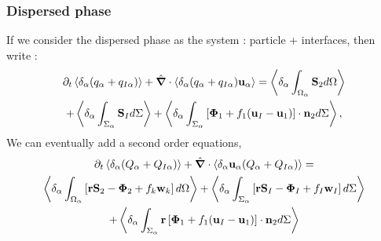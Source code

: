 \subsubsection{Dispersed phase}
If we consider the dispersed phase as the system : particle + interfaces, then write : 
\begin{multline}
    \partial_t \left<\delta_\alpha  (q_\alpha+q_{I\alpha})\right>
    + \hat{\bm{\nabla}} \cdot\left<\delta_\alpha  (q_\alpha+q_{I\alpha}) \textbf{u}_\alpha\right>
    = \left<\delta_\alpha \int_{\Omega_\alpha} \textbf{S}_2 d\Omega\right>\\
    + \left<\delta_\alpha \int_{\Sigma_\alpha} \textbf{S}_I d\Sigma\right>
    + \left<\delta_\alpha \int_{\Sigma_\alpha} \left[\bm{\Phi}_1 + f_1 (\textbf{u}_I-\textbf{u}_1) \right] \cdot \textbf{n}_2 d\Sigma\right>,
    \label{eq:hybrid_avg_dt_dq_alpha}\\
\end{multline}
We can eventually add a second order equations,
\begin{multline}
    \partial_t \left<\delta_\alpha (Q_\alpha+Q_{I\alpha})\right>
    + \hat{\bm{\nabla}}\cdot \left<\delta_\alpha   \textbf{u}_\alpha (Q_\alpha+Q_{I\alpha})\right>
    =\\ \left<\delta_\alpha \int_{\Omega_\alpha} \left[
        \textbf{r}\textbf{S}_2
        - \mathbf{\Phi}_2
        + f_k\textbf{w}_k
        \right] d\Omega\right>
    + \left<\delta_\alpha \int_{\Sigma_\alpha} \left[
        \textbf{r}\textbf{S}_I
        - \mathbf{\Phi}_I
        + f_I\textbf{w}_I
    \right] d\Sigma\right>\\
    + \left<\delta_\alpha \int_{\Sigma_\alpha} \textbf{r}\left[\bm{\Phi}_1 + f_1 (\textbf{u}_I-\textbf{u}_1) \right] \cdot \textbf{n}_2 d\Sigma\right>\\
    \label{eq:hybrid_avg_dt_dQ_alpha}\\
\end{multline}